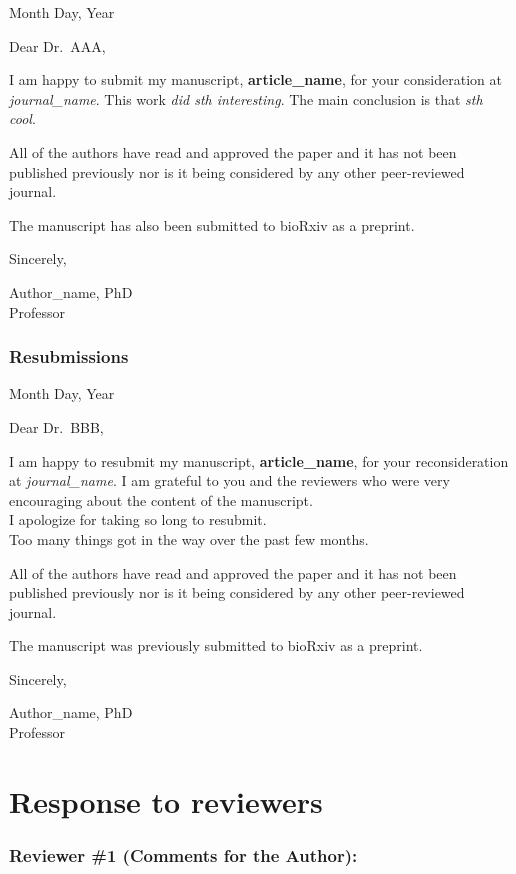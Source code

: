 \documentclass[review]{elsarticle} %
\begin{document}
Month Day, Year

Dear Dr.~AAA,

I am happy to submit my manuscript, \textbf{article\_name}, for your
consideration at \emph{journal\_name}. This work \emph{did sth
interesting}. The main conclusion is that \emph{sth cool}.

All of the authors have read and approved the paper and it has not been
published previously nor is it being considered by any other
peer-reviewed journal.

The manuscript has also been submitted to bioRxiv as a preprint.

Sincerely,

Author\_name, PhD\\
Professor

\subsubsection*{Resubmissions}\label{resubmissions}

Month Day, Year

Dear Dr.~BBB,

I am happy to resubmit my manuscript, \textbf{article\_name}, for your
reconsideration at \emph{journal\_name}. I am grateful to you and the
reviewers who were very encouraging about the content of the
manuscript.\\
I apologize for taking so long to resubmit.\\
Too many things got in the way over the past few months.

All of the authors have read and approved the paper and it has not been
published previously nor is it being considered by any other
peer-reviewed journal.

The manuscript was previously submitted to bioRxiv as a preprint.

Sincerely,

Author\_name, PhD\\
Professor

\section*{Response to reviewers}\label{response-to-reviewers}

\subsubsection*{Reviewer \#1 (Comments for the
Author):}\label{reviewer-1-comments-for-the-author}
\end{document}
